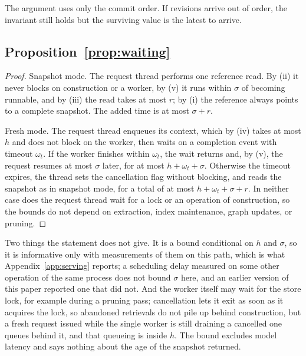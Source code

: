 \documentclass{article} %
\begin{document}
The argument uses only the commit order. If revisions arrive out of order, the invariant still holds but the surviving value is the latest to arrive.

\subsection{Proposition~\ref{prop:waiting}}

\begin{proof}
Snapshot mode. The request thread performs one reference read. By (ii) it never blocks on construction or a worker, by (v) it runs within $\sigma$ of becoming runnable, and by (iii) the read takes at most $r$; by (i) the reference always points to a complete snapshot. The added time is at most $\sigma+r$.

Fresh mode. The request thread enqueues its context, which by (iv) takes at most $h$ and does not block on the worker, then waits on a completion event with timeout $\omega_t$. If the worker finishes within $\omega_t$, the wait returns and, by (v), the request resumes at most $\sigma$ later, for at most $h+\omega_t+\sigma$. Otherwise the timeout expires, the thread sets the cancellation flag without blocking, and reads the snapshot as in snapshot mode, for a total of at most $h+\omega_t+\sigma+r$. In neither case does the request thread wait for a lock or an operation of construction, so the bounds do not depend on extraction, index maintenance, graph updates, or pruning.
\end{proof}

Two things the statement does not give. It is a bound conditional on $h$ and $\sigma$, so it is informative only with measurements of them on this path, which is what Appendix~\ref{app:serving} reports; a scheduling delay measured on some other operation of the same process does not bound $\sigma$ here, and an earlier version of this paper reported one that did not. And the worker itself may wait for the store lock, for example during a pruning pass; cancellation lets it exit as soon as it acquires the lock, so abandoned retrievals do not pile up behind construction, but a fresh request issued while the single worker is still draining a cancelled one queues behind it, and that queueing is inside $h$. The bound excludes model latency and says nothing about the age of the snapshot returned.
\end{document}
